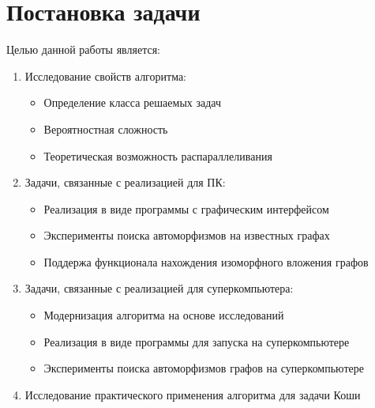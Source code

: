 \section{Постановка задачи}
\label{sec:Problem_1} 
\large

Целью данной работы является:
\begin{enumerate}
\item Исследование свойств алгоритма:
\begin{itemize}
\item Определение класса решаемых задач
\item Вероятностная сложность
\item Теоретическая возможность распараллеливания
\end{itemize}
\item Задачи, связанные с реализацией для ПК:
\begin{itemize}
\item Реализация в виде программы с графическим интерфейсом
\item Эксперименты поиска автоморфизмов на известных графах
\item Поддержа функционала нахождения изоморфного вложения графов
\end{itemize}
\item Задачи, связанные с реализацией для суперкомпьютера:
\begin{itemize}
\item Модернизация алгоритма на основе исследований
\item Реализация в виде программы для запуска на суперкомпьютере
\item Эксперименты поиска автоморфизмов графов на суперкомпьютере
\end{itemize}
\item Исследование практического применения алгоритма для задачи Коши
\end{enumerate}

